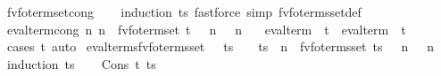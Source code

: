 \begin{isabellebody}
\isamarkupfalse%
\ fv{\isacharunderscore}{\kern0pt}fo{\isacharunderscore}{\kern0pt}term{\isacharunderscore}{\kern0pt}set{\isacharunderscore}{\kern0pt}cong\isanewline
\ \ \isamarkupfalse%
\ {\isacharparenleft}{\kern0pt}induction\ ts{\isacharparenright}{\kern0pt}\ {\isacharparenleft}{\kern0pt}fastforce\ simp{\isacharcolon}{\kern0pt}\ fv{\isacharunderscore}{\kern0pt}fo{\isacharunderscore}{\kern0pt}terms{\isacharunderscore}{\kern0pt}set{\isacharunderscore}{\kern0pt}def{\isacharparenright}{\kern0pt}{\isacharplus}{\kern0pt}%
\endisatagproof
{\isafoldproof}%
%
\isadelimproof
\isanewline
%
\endisadelimproof
\isanewline
{}\isamarkupfalse%
\ eval{\isacharunderscore}{\kern0pt}term{\isacharunderscore}{\kern0pt}cong{\isacharcolon}{\kern0pt}\ {\isachardoublequoteopen}{\isacharparenleft}{\kern0pt}{\isasymAnd}n{\isachardot}{\kern0pt}\ n\ {\isasymin}\ fv{\isacharunderscore}{\kern0pt}fo{\isacharunderscore}{\kern0pt}term{\isacharunderscore}{\kern0pt}set\ t\ {\isasymLongrightarrow}\ {\isasymsigma}\ n\ {\isacharequal}{\kern0pt}\ {\isasymsigma}{\isacharprime}{\kern0pt}\ n{\isacharparenright}{\kern0pt}\ {\isasymLongrightarrow}\isanewline
\ \ eval{\isacharunderscore}{\kern0pt}term\ {\isasymsigma}\ t\ {\isacharequal}{\kern0pt}\ eval{\isacharunderscore}{\kern0pt}term\ {\isasymsigma}{\isacharprime}{\kern0pt}\ t{\isachardoublequoteclose}\isanewline
%
\isadelimproof
\ \ %
\endisadelimproof
%
\isatagproof
{}\isamarkupfalse%
\ {\isacharparenleft}{\kern0pt}cases\ t{\isacharparenright}{\kern0pt}\ auto%
\endisatagproof
{\isafoldproof}%
%
\isadelimproof
\isanewline
%
\endisadelimproof
\isanewline
{}\isamarkupfalse%
\ eval{\isacharunderscore}{\kern0pt}terms{\isacharunderscore}{\kern0pt}fv{\isacharunderscore}{\kern0pt}fo{\isacharunderscore}{\kern0pt}terms{\isacharunderscore}{\kern0pt}set{\isacharcolon}{\kern0pt}\ {\isachardoublequoteopen}{\isasymsigma}\ {\isasymodot}\ ts\ {\isacharequal}{\kern0pt}\ {\isasymsigma}{\isacharprime}{\kern0pt}\ {\isasymodot}\ ts\ {\isasymLongrightarrow}\ n\ {\isasymin}\ fv{\isacharunderscore}{\kern0pt}fo{\isacharunderscore}{\kern0pt}terms{\isacharunderscore}{\kern0pt}set\ ts\ {\isasymLongrightarrow}\ {\isasymsigma}\ n\ {\isacharequal}{\kern0pt}\ {\isasymsigma}{\isacharprime}{\kern0pt}\ n{\isachardoublequoteclose}\isanewline
%
\isadelimproof
%
\endisadelimproof
%
\isatagproof
{}\isamarkupfalse%
\ {\isacharparenleft}{\kern0pt}induction\ ts{\isacharparenright}{\kern0pt}\isanewline
\ \ \isamarkupfalse%
\ {\isacharparenleft}{\kern0pt}Cons\ t\ ts{\isacharparenright}{\kern0pt}\isanewline

\end{isabellebody}
